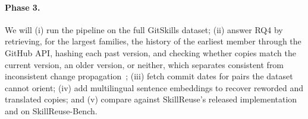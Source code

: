 \paragraph{Phase 3.} We will (i) run the pipeline on the full GitSkills dataset; (ii) answer
RQ4 by retrieving, for the largest families, the history of the earliest member through the
GitHub API, hashing each past version, and checking whether copies match the current version,
an older version, or neither, which separates consistent from inconsistent change
propagation~\cite{kim2005genealogy}; (iii) fetch commit dates for pairs the dataset cannot
orient; (iv) add multilingual sentence embeddings to recover reworded and translated copies;
and (v) compare against SkillReuse's released implementation and on SkillReuse-Bench.
